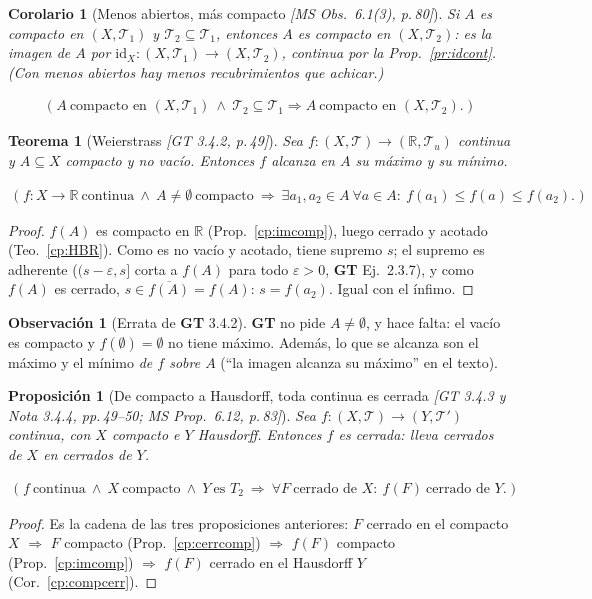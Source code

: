\documentclass[11pt,a4paper]{article}
\newcommand{\lgc}[1]{\par\vspace{-3pt}\begin{gather*}\big(\;#1\;\big)\end{gather*}\vspace{-6pt}}
\theoremstyle{definition}
\newtheorem{observacion}[definicion]{Observación}
\theoremstyle{plain}
\newtheorem{teorema}[definicion]{Teorema}
\newtheorem{proposicion}[definicion]{Proposición}
\newtheorem{corolario}[definicion]{Corolario}
\newcommand{\fnt}[1]{{\normalfont\small\itshape\color{gray!150!black}[#1]}}
\newcommand{\R}{\mathbb{R}}
\newcommand{\cl}[1]{\overline{#1}}
\newcommand{\tp}{\mathcal{T}}
\begin{document}
\begin{corolario}[Menos abiertos, más compacto \fnt{MS Obs.\ 6.1(3), p.\,80}]
Si $A$ es compacto en $(X,\tp_1)$ y $\tp_2\subseteq\tp_1$, entonces $A$ es compacto en $(X,\tp_2)$: es la imagen de $A$ por $\mathrm{id}_X:(X,\tp_1)\to(X,\tp_2)$, continua por la Prop.~\ref{pr:idcont}. (Con menos abiertos hay menos recubrimientos que achicar.)
\lgc{A\ \text{compacto en } (X,\tp_1)\ \wedge\ \tp_2\subseteq\tp_1\Rightarrow A\ \text{compacto en } (X,\tp_2).}
\end{corolario}

\begin{teorema}[Weierstrass \fnt{GT 3.4.2, p.\,49}]\label{cp:weier}
Sea $f:(X,\tp)\to(\R,\tp_u)$ continua y $A\subseteq X$ compacto y no vacío. Entonces $f$ alcanza en $A$ su máximo y su mínimo.
\lgc{f:X\to\R\ \text{continua}\ \wedge\ A\ne\emptyset\ \text{compacto}\ \Rightarrow\ \exists a_1,a_2\in A\ \forall a\in A:\ f(a_1)\le f(a)\le f(a_2).}
\end{teorema}

\begin{proof}
$f(A)$ es compacto en $\R$ (Prop.~\ref{cp:imcomp}), luego cerrado y acotado (Teo.~\ref{cp:HBR}). Como es no vacío y acotado, tiene supremo $s$; el supremo es adherente ($(s-\varepsilon,s]$ corta a $f(A)$ para todo $\varepsilon>0$, \textbf{GT} Ej.\ 2.3.7), y como $f(A)$ es cerrado, $s\in\cl{f(A)}=f(A)$: $s=f(a_2)$. Igual con el ínfimo.
\end{proof}

\begin{observacion}[Errata de \textbf{GT} 3.4.2]
\textbf{GT} no pide $A\ne\emptyset$, y hace falta: el vacío es compacto y $f(\emptyset)=\emptyset$ no tiene máximo. Además, lo que se alcanza son el máximo y el mínimo \emph{de $f$ sobre $A$} (``la imagen alcanza su máximo'' en el texto).
\end{observacion}

\begin{proposicion}[De compacto a Hausdorff, toda continua es cerrada \fnt{GT 3.4.3 y Nota 3.4.4, pp.\,49--50; MS Prop.\ 6.12, p.\,83}]\label{cp:cerrada}
Sea $f:(X,\tp)\to(Y,\tp')$ continua, con $X$ compacto e $Y$ Hausdorff. Entonces $f$ es cerrada: lleva cerrados de $X$ en cerrados de $Y$.
\lgc{f\ \text{continua}\ \wedge\ X\ \text{compacto}\ \wedge\ Y\ \text{es }T_2\ \Rightarrow\ \forall F\ \text{cerrado de } X:\ f(F)\ \text{cerrado de } Y.}
\end{proposicion}

\begin{proof}
Es la cadena de las tres proposiciones anteriores: $F$ cerrado en el compacto $X$ $\Rightarrow$ $F$ compacto (Prop.~\ref{cp:cerrcomp}) $\Rightarrow$ $f(F)$ compacto (Prop.~\ref{cp:imcomp}) $\Rightarrow$ $f(F)$ cerrado en el Hausdorff $Y$ (Cor.~\ref{cp:compcerr}).
\end{proof}
\end{document}
